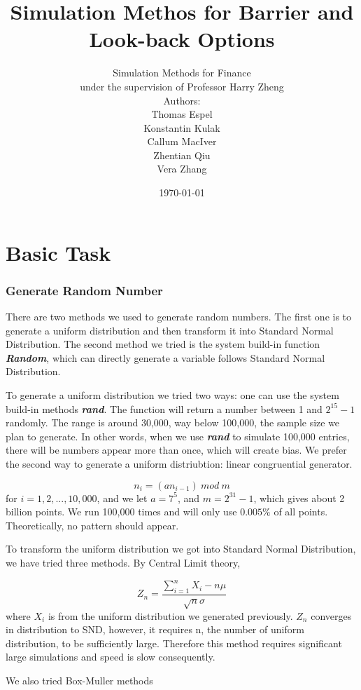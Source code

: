 \documentclass[11pt,a4paper,fleqn,draft]{article}
\author{Simulation Methods for Finance\\under the supervision of Professor Harry Zheng
\\[5cm] Authors:\\
Thomas Espel\\ Konstantin Kulak\\ Callum MacIver\\Zhentian Qiu\\Vera Zhang}
\title{Simulation Methos for Barrier and Look-back Options}
\date{\today}
\begin{document}
\maketitle

\newpage

\tableofcontents

\newpage
\setcounter{page}{1}

\part{Basic Task}
\section{Generate Random Number}

There are two methods we used to generate random numbers.
The first one is to generate a uniform distribution and then transform it into Standard Normal Distribution. The second method we tried is the system build-in function\textbf{\textit{ Random}}, which can directly generate a variable follows Standard Normal Distribution.

To generate a uniform distribution we tried two ways: one can use the system build-in methods \textbf{\textit{rand}}. The function will return a number between 1 and $2^{15} -1$ randomly. The range is around 30,000, way below 100,000, the sample size we plan to generate. In other words, when we use \textbf{\textit{rand}} to simulate 100,000 entries, there will be numbers appear more than once, which will create bias. We prefer the second way to generate a uniform distriubtion: linear congruential generator.

$$n_i = (an_{i-1}) \ mod\ m$$for $i=1,2,...,10,000$, and we let $ a = 7^5$, and $m = 2^{31}-1$, which gives about 2 billion points. We run 100,000 times and will only use $0.005\%$ of all points. Theoretically, no pattern should appear.

To transform the uniform distribution we got into Standard Normal Distribution, we have tried three methods. By Central Limit theory,

$$ Z_n = \frac{\sum_{i=1}^{n}X_i-n\mu}{\sqrt{n}\sigma}$$where $X_i$ is from the uniform distribution we generated previously. $Z_n$ converges in distribution to SND, however, it requires n, the number of uniform distribution, to be sufficiently large. Therefore this method requires significant large simulations and speed is slow consequently.

We also tried Box-Muller methods  \cite{lectures}
\end{document}

